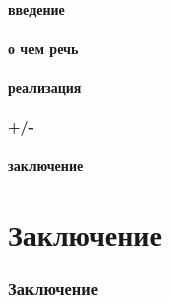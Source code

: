 \documentclass[aspectratio=169]{beamer}
\begin{document}
      \subsection{введение}
        
      \subsection{о чем речь}
        
      \subsection{реализация}
        
      \subsection{+/-}
        
      \subsection{заключение}
        
  \part{Заключение}
    \section{Заключение}
      
\end{document}
